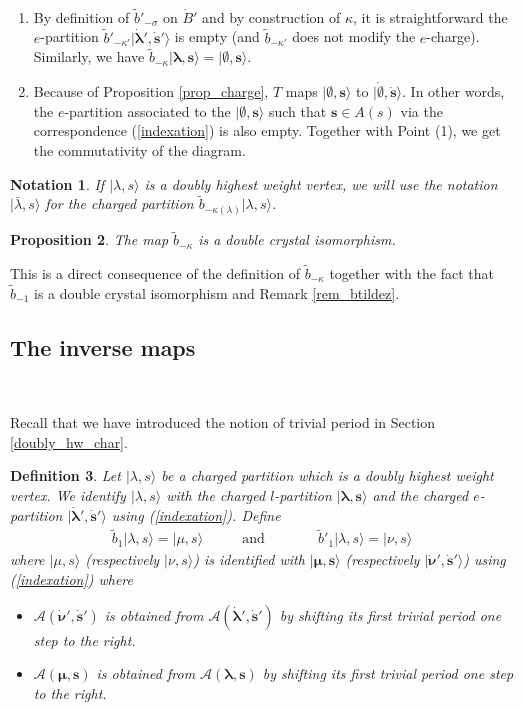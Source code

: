 \documentclass[twoside,12pt]{amsart}
\theoremstyle{plain}
\newcommand{\cA}{\mathcal{A}}
\newcommand{\bs}{\mathbf{s}}
\newcommand{\si}{\sigma}
\newcommand{\la}{\lambda}
\newcommand{\ka}{\kappa}
\newcommand{\bla}{\boldsymbol{\la}}
\newcommand{\bnu}{\boldsymbol{\nu}}
\newcommand{\bmu}{\boldsymbol{\mu}}
\newcommand{\tb}{\tilde{b}}
\newcommand{\dB}{\dot{B}}
\newcommand{\dbs}{\dot{\bs}}
\newcommand{\dbla}{\dot{\bla}}
\newcommand{\dbnu}{\dot{\bnu}}
\newcommand{\mand}{\quad\text{and}\quad}
\newcommand{\bemp}{\boldsymbol{\emptyset}}
\newcommand{\dbemp}{\dot{\bemp}}
\newtheorem{num}{Notation}[section]
\newtheorem{defi}[num]{Definition}
\newtheorem{prop}[num]{Proposition}
\theoremstyle{remark}
\begin{document}
\proof\
\begin{enumerate}
 \item By definition of $\tb'_{-\si}$ on $\dB'$
and by construction of $\ka$, it is straightforward
the $e$-partition $\tb'_{-\ka'}|\dbla',\dbs'\rangle$ is empty
(and $\tb_{-\ka'}$ does not modify the $e$-charge).
Similarly, we have $\tb_{-\ka}|\bla,\bs\rangle=|\bemp,\bs\rangle$.
\item 
Because of Proposition \ref{prop_charge},
$T$ maps $|\bemp,\bs\rangle$ to $|\dbemp,\dbs\rangle$.
In other words, the $e$-partition associated to 
the $|\bemp,\bs\rangle$ such that $\bs\in A(s)$
via the correspondence (\ref{indexation}) is also empty.
Together with Point (1), we get the commutativity of the diagram.
\end{enumerate}
\endproof

\begin{num}\label{not_dhw}
If $|\la,s\rangle$ is a doubly highest weight vertex, we will use the notation
$|\bar{\la},s\rangle$ for the charged partition $\tb_{-\ka(\la)}|\la,s\rangle$.
\end{num}




\begin{prop}\label{prop_btildekappa}
The map $\tb_{-\ka}$ is a double crystal isomorphism.
\end{prop}

\proof
This is a direct consequence of the definition of $\tb_{-\ka}$
together with the fact that $\tb_{-1}$ is a double crystal isomorphism 
and Remark \ref{rem_btildez}.
\endproof



\subsection{The inverse maps} \label{btilde_inv}\

Recall that we have introduced the notion of trivial period in Section \ref{doubly_hw_char}.

\begin{defi}\label{def_btilde+}
Let $|\la,s\rangle$ be a charged partition
which is a doubly highest weight vertex.
We identify $|\la,s\rangle$ with the charged  $l$-partition $|\bla,\bs\rangle$
and the charged $e$-partition $|\dbla',\dbs'\rangle$ using (\ref{indexation}).
Define 
$$
\begin{array}{ccc}
\tb_{1}|\la,s\rangle = |\mu,s\rangle
&
\quad \mand \quad\quad
&
\tb'_{1}|\la,s\rangle = |\nu,s\rangle
\end{array}
$$
where $|\mu,s\rangle$ (respectively $|\nu,s\rangle$) 
is identified with $|\bmu,\bs\rangle$ (respectively $|\dbnu',\dbs'\rangle$) 
using (\ref{indexation})
where 
\begin{itemize}
 \item $\cA(\dbnu',\dbs')$ is obtained from $\cA(\dbla',\dbs')$ by shifting its first trivial period one step to the right.
\item $\cA(\bmu,\bs)$ is obtained from $\cA(\bla,\bs)$ by shifting its first trivial period one step to the right.
\end{itemize}
\end{defi}
\end{document}
